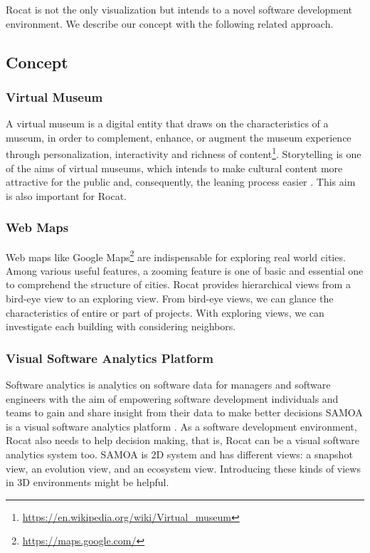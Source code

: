 \documentclass[conference]{IEEEtran}
\begin{document}
Rocat is not the only visualization but intends to a novel software development environment.
We describe our concept with the following related approach.


\subsection{Concept}
\subsubsection{Virtual Museum}
A virtual museum is a digital entity that draws on the characteristics of a museum, in order to complement, enhance, or augment the museum
experience through personalization, interactivity and richness of content\footnote{\url{https://en.wikipedia.org/wiki/Virtual_museum}}.
Storytelling is one of the aims of virtual museums, which intends to make cultural content more attractive for the public and, consequently, the leaning process easier \cite{Pietroni:2014:IVR:2635823.2611375}.
This aim is also important for Rocat.

\subsubsection{Web Maps}
Web maps like Google Maps\footnote{\url{https://maps.google.com/}} are indispensable for exploring real world cities.
Among various useful features, a zooming feature is one of basic and essential one to comprehend the structure of cities.
Rocat provides hierarchical views from a bird-eye view to an exploring view.
From bird-eye views, we can glance the characteristics of entire or part of projects.
With exploring views, we can investigate each building with considering neighbors.

\subsubsection{Visual Software Analytics Platform}
Software analytics is analytics on software data for managers and software engineers with the aim of empowering software development individuals and teams to gain and share insight from their data to make better decisions \cite{Menzies:2013:SAS:2553351.2553360} SAMOA is a visual software analytics platform \cite{6676936}.
As a software development environment, Rocat also needs to help decision making, that is, Rocat can be a visual software analytics system too.
SAMOA is 2D system and has different views: a snapshot view, an evolution view, and an ecosystem view.
Introducing these kinds of views in 3D environments might be helpful.
\end{document}
